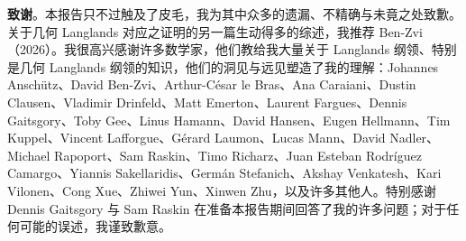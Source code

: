 \textbf{致谢}。本报告只不过触及了皮毛，我为其中众多的遗漏、不精确与未竟之处致歉。关于几何 Langlands 对应之证明的另一篇生动得多的综述，我推荐 Ben-Zvi（2026）。我很高兴感谢许多数学家，他们教给我大量关于 Langlands 纲领、特别是几何 Langlands 纲领的知识，他们的洞见与远见塑造了我的理解：Johannes Anschütz、David Ben-Zvi、Arthur-César le Bras、Ana Caraiani、Dustin Clausen、Vladimir Drinfeld、Matt Emerton、Laurent Fargues、Dennis Gaitsgory、Toby Gee、Linus Hamann、David Hansen、Eugen Hellmann、Tim Kuppel、Vincent Lafforgue、Gérard Laumon、Lucas Mann、David Nadler、Michael Rapoport、Sam Raskin、Timo Richarz、Juan Esteban Rodríguez Camargo、Yiannis Sakellaridis、Germán Stefanich、Akshay Venkatesh、Kari Vilonen、Cong Xue、Zhiwei Yun、Xinwen Zhu，以及许多其他人。特别感谢 Dennis Gaitsgory 与 Sam Raskin 在准备本报告期间回答了我的许多问题；对于任何可能的误述，我谨致歉意。
